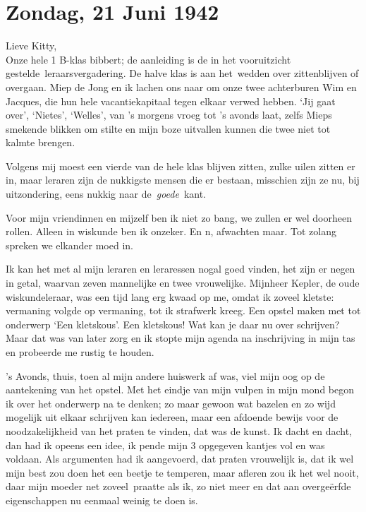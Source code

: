 \documentclass{book}
\begin{document}
\section*{Zondag, 21 Juni 1942}

Lieve Kitty,\\
Onze hele 1 B-klas bibbert; de aanleiding is de in het
vooruitzicht gestelde~leraarsvergadering. De halve klas is aan het~wedden over
zittenblijven of overgaan. Miep de Jong en ik lachen ons naar om onze twee
achterburen Wim en Jacques, die hun hele vacantiekapitaal tegen elkaar verwed
hebben. `Jij gaat over', `Nietes', `Welles', van 's morgens vroeg tot 's avonds
laat, zelfs Mieps smekende blikken om stilte en mijn boze uitvallen kunnen die
twee niet tot kalmte brengen.

Volgens mij moest een vierde van de hele klas blijven zitten, zulke uilen zitten
er in, maar leraren zijn de nukkigste mensen die er bestaan, misschien zijn ze
nu, bij uitzondering, eens nukkig naar de~\emph{goede}~kant.

Voor mijn vriendinnen en mijzelf ben ik niet zo bang, we zullen er wel doorheen
rollen. Alleen in wiskunde ben ik onzeker. En n, afwachten maar. Tot zolang
spreken we elkander moed in.

Ik kan het met al mijn leraren en leraressen nogal goed vinden, het zijn er
negen in getal, waarvan zeven mannelijke en twee vrouwelijke.  Mijnheer Kepler,
de oude wiskundeleraar, was een tijd lang erg kwaad op me, omdat ik zoveel
kletste: vermaning volgde op vermaning, tot ik strafwerk kreeg. Een opstel maken
met tot onderwerp `Een kletskous'. Een kletskous! Wat kan je daar nu over
schrijven? Maar dat was van later zorg en ik stopte mijn agenda na inschrijving
in mijn tas en probeerde me rustig te houden.

's Avonds, thuis, toen al mijn andere huiswerk af was, viel mijn oog op de
aantekening van het opstel. Met het eindje van mijn vulpen in mijn mond begon ik
over het onderwerp na te denken; zo maar gewoon wat bazelen en zo wijd mogelijk
uit elkaar schrijven kan iedereen, maar een afdoende bewijs voor de
noodzakelijkheid van het praten te vinden, dat was de kunst. Ik dacht en dacht,
dan had ik opeens een idee, ik pende mijn 3 opgegeven kantjes vol en was
voldaan. Als argumenten had ik aangevoerd, dat praten vrouwelijk is, dat ik wel
mijn best zou doen het een beetje te temperen, maar afleren zou ik het wel
nooit, daar mijn moeder net zoveel~praatte als ik, zo niet meer en dat aan
overgeërfde eigenschappen nu eenmaal weinig te doen is.
\end{document}
